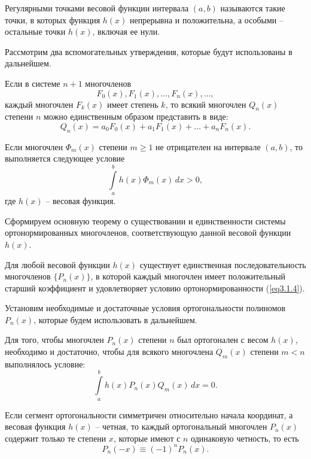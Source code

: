 \begin{definition}
    Регулярными точками весовой функции интервала \( (a, b) \) называются такие
    точки, в которых функция \( h(x) \) непрерывна и положительна, а особыми --
    остальные точки \( h(x) \), включая ее нули.
\end{definition}

Рассмотрим два вспомогательных утверждения, которые будут использованы в
дальнейшем.
\begin{lemma}
    Если в системе \( n + 1 \) многочленов
    \[
        F_0(x), F_1(x), \ldots, F_n(x), \ldots,
    \]
    каждый многочлен \( F_k(x) \) имеет степень \( k \), то всякий многочлен
    \( Q_n(x) \) степени \( n \) можно единственным образом представить в виде:
    \[
        Q_n(x) = a_0F_0(x) + a_1F_1(x) + \ldots + a_nF_n(x).
    \]
\end{lemma}

\begin{lemma}
    Если многочлен \( \varPhi_m(x) \) степени \( m \ge 1 \) не отрицателен на
    интервале \( (a, b) \), то выполняется следующее условие
    \[
        \int\limits_a^b h(x)\varPhi_m(x)\,dx > 0,
    \]
    где \( h(x) \) -- весовая функция.
\end{lemma}

Сформируем основную теорему о существовании и единственности системы
ортонормированных многочленов, соответствующую данной весовой функции \( h(x) \).

\begin{theorem}
    Для любой весовой функции \( h(x) \) существует единственная
    последовательность многочленов \( \{ P_n(x) \} \), в которой каждый
    многочлен имеет положительный старший коэффициент и удовлетворяет условию
    ортонормированности (\ref{eq3.1.4}).
    \label{th3.1.1}
\end{theorem}

Установим необходимые и достаточные условия ортогональности полиномов
 \( P_n(x) \), которые будем использовать в дальнейшем.
\begin{theorem}
    Для того, чтобы многочлен \( P_n(x) \) степени \( n \) был ортогонален с
    весом \( h(x) \), необходимо и достаточно, чтобы для всякого многочлена
    \( Q_m(x) \) степени \( m < n \) выполнялось условие:
    \[
        \int\limits_a^b h(x)P_n(x)Q_m(x)\,dx = 0.
    \]
\end{theorem}
\begin{theorem}
    Если сегмент ортогональности симметричен относительно начала координат, а
    весовая функция \( h(x) \) -- четная, то каждый ортогональный многочлен
    \( P_n(x) \) содержит только те степени \( x \), которые имеют с \( n \)
    одинаковую четность, то есть
    \[
        P_n(-x) \equiv (-1)^nP_n(x).
    \]
\end{theorem}

